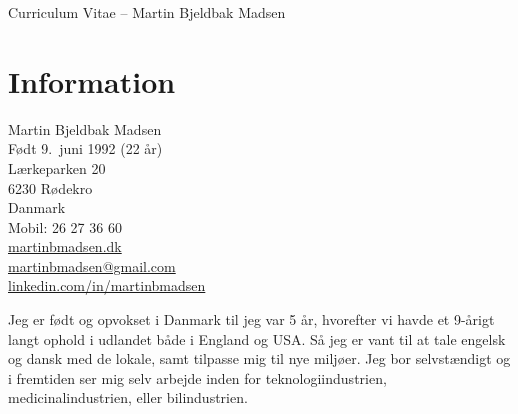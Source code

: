 \documentclass[margin,line,a4paper]{resume}
\begin{document}
\raggedright
{\sc \Large Curriculum Vitae -- Martin Bjeldbak Madsen}
\begin{resume}
    \vspace{0.5cm}
    \begin{figure}
         \vspace{-1cm}
        \begin{center}
        \end{center}
         \vspace{-2cm}
    \end{figure}

    \section{\mysidestyle Information}%
    Martin Bjeldbak Madsen\\
    Født 9.\ juni 1992 (22 år)\\ 
    Lærkeparken 20\\
    6230 Rødekro\\
    Danmark\\
    Mobil: 26 27 36 60\\
    \href{http://martinbmadsen.dk}{martinbmadsen.dk}\\
    \href{mailto:martinbmadsen@gmail.com}{martinbmadsen@gmail.com}\\
    \href{http://dk.linkedin.com/in/martinbmadsen}{linkedin.com/in/martinbmadsen}
    \vspace{1cm}

    Jeg er født og opvokset i Danmark til jeg var 5 år, hvorefter vi havde et
    9-årigt langt ophold i udlandet både i England og USA. Så jeg er
    vant til at tale engelsk og dansk med de lokale, samt tilpasse mig
    til nye miljøer. Jeg bor selvstændigt og i fremtiden ser mig selv
    arbejde inden for teknologiindustrien, medicinalindustrien, eller
    bilindustrien.


\end{resume}
\end{document}
